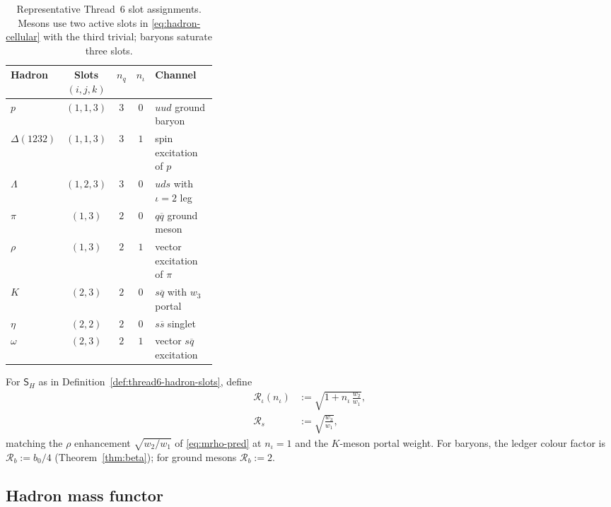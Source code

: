 \begin{table}[ht]
\centering
\small
\renewcommand{\arraystretch}{1.10}
\begin{tabular}{@{}lcccp{0.34\linewidth}@{}}
\toprule
\textbf{Hadron} & \textbf{Slots $(i,j,k)$} & $n_q$ & $n_\iota$ &
  \textbf{Channel} \\
\midrule
$p$ & $(1,1,3)$ & $3$ & $0$ & $uud$ ground baryon \\
$\Delta(1232)$ & $(1,1,3)$ & $3$ & $1$ & spin excitation of $p$ \\
$\Lambda$ & $(1,2,3)$ & $3$ & $0$ & $uds$ with $\iota=2$ leg \\
$\pi$ & $(1,3)$ & $2$ & $0$ & $q\overline{q}$ ground meson \\
$\rho$ & $(1,3)$ & $2$ & $1$ & vector excitation of $\pi$ \\
$K$ & $(2,3)$ & $2$ & $0$ & $s\overline{q}$ with $w_3$ portal \\
$\eta$ & $(2,2)$ & $2$ & $0$ & $s\overline{s}$ singlet \\
$\omega$ & $(2,3)$ & $2$ & $1$ & vector $s\overline{q}$ excitation \\
\bottomrule
\end{tabular}
\caption{Representative Thread~6 slot assignments. Mesons use two active slots
in \eqref{eq:hadron-cellular} with the third trivial; baryons saturate three
slots.}
\label{tab:thread6-slots}
\end{table}

\begin{definition}
\label{def:thread6-residues}
For $\mathsf{S}_H$ as in Definition~\ref{def:thread6-hadron-slots}, define
\begin{align}
  \mathcal{R}_\iota(n_\iota)
  &:=
  \sqrt{1+n_\iota\,\frac{w_2}{w_1}},
  \label{eq:thread6-R-iota}\\[4pt]
  \mathcal{R}_s
  &:=
  \sqrt{\frac{w_3}{w_1}},
  \label{eq:thread6-R-s}
\end{align}
matching the $\rho$ enhancement $\sqrt{w_2/w_1}$ of \eqref{eq:mrho-pred} at
$n_\iota=1$ and the $K$-meson portal weight. For baryons, the ledger colour
factor is $\mathcal{R}_b:=b_0/4$ (Theorem~\ref{thm:beta}); for ground mesons
$\mathcal{R}_b:=2$.
\end{definition}

\subsection{Hadron mass functor}
\label{sec:wave3-thread6:hadron}

